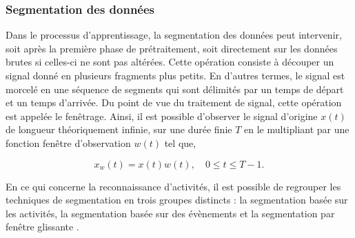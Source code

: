 \subsubsection{Segmentation des données}



Dans le processus d'apprentissage, la segmentation des données peut intervenir, soit après la première phase de prétraitement, soit directement sur les données brutes si celles-ci ne sont pas altérées. Cette opération consiste à découper un signal donné en plusieurs fragments plus petits. En d'autres termes, le signal est morcelé en une séquence de segments qui sont délimités par un temps de départ et un temps d'arrivée. Du point de vue du traitement de signal, cette opération est appelée le fenêtrage. Ainsi, il est possible d'observer le signal d'origine $x\left(t\right)$ de longueur théoriquement infinie, sur une durée finie $T$ en le multipliant par une fonction fenêtre d'observation $w\left(t\right)$ tel que,

\begin{equation}
    x_w\left(t\right) = x\left(t\right)w\left(t\right), \quad 0 \leq t \leq T - 1.
\end{equation}

En ce qui concerne la reconnaissance d'activités, il est possible de regrouper les techniques de segmentation en trois groupes distincts : la segmentation basée sur les activités, la segmentation basée sur des évènements et la segmentation par fenêtre glissante \citep{Banos2014}.

